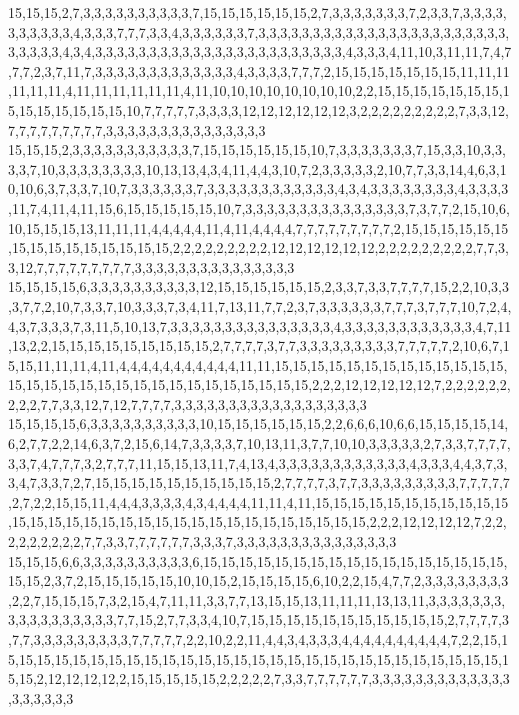 15,15,15,2,7,3,3,3,3,3,3,3,3,3,3,7,15,15,15,15,15,15,2,7,3,3,3,3,3,3,3,7,2,3,3,7,3,3,3,3,3,3,3,3,3,3,4,3,3,3,7,7,7,3,3,4,3,3,3,3,3,3,7,3,3,3,3,3,3,3,3,3,3,3,3,3,3,3,3,3,3,3,3,3,3,3,3,3,3,3,3,4,3,4,3,3,3,3,3,3,3,3,3,3,3,3,3,3,3,3,3,3,3,3,3,3,3,4,3,3,3,4,11,10,3,11,11,7,4,7,7,7,2,3,7,11,7,3,3,3,3,3,3,3,3,3,3,3,3,3,4,3,3,3,3,7,7,7,2,15,15,15,15,15,15,15,11,11,11,11,11,11,4,11,11,11,11,11,11,4,11,10,10,10,10,10,10,10,10,2,2,15,15,15,15,15,15,15,15,15,15,15,15,15,15,10,7,7,7,7,7,3,3,3,3,12,12,12,12,12,12,3,2,2,2,2,2,2,2,2,2,7,3,3,12,7,7,7,7,7,7,7,7,7,3,3,3,3,3,3,3,3,3,3,3,3,3,3,3
15,15,15,2,3,3,3,3,3,3,3,3,3,3,3,7,15,15,15,15,15,15,10,7,3,3,3,3,3,3,3,7,15,3,3,10,3,3,3,3,7,10,3,3,3,3,3,3,3,3,10,13,13,4,3,4,11,4,4,3,10,7,2,3,3,3,3,3,2,10,7,7,3,3,14,4,6,3,10,10,6,3,7,3,3,7,10,7,3,3,3,3,3,3,7,3,3,3,3,3,3,3,3,3,3,3,3,4,3,4,3,3,3,3,3,3,3,3,4,3,3,3,3,11,7,4,11,4,11,15,6,15,15,15,15,15,10,7,3,3,3,3,3,3,3,3,3,3,3,3,3,3,3,7,3,7,7,2,15,10,6,10,15,15,15,13,11,11,11,4,4,4,4,4,11,4,11,4,4,4,4,7,7,7,7,7,7,7,7,7,2,15,15,15,15,15,15,15,15,15,15,15,15,15,15,15,2,2,2,2,2,2,2,2,2,12,12,12,12,12,12,2,2,2,2,2,2,2,2,2,7,7,3,3,12,7,7,7,7,7,7,7,7,7,3,3,3,3,3,3,3,3,3,3,3,3,3,3,3
15,15,15,15,6,3,3,3,3,3,3,3,3,3,3,12,15,15,15,15,15,15,2,3,3,7,3,3,7,7,7,7,15,2,2,10,3,3,3,7,7,2,10,7,3,3,7,10,3,3,3,7,3,4,11,7,13,11,7,7,2,3,7,3,3,3,3,3,3,7,7,7,3,7,7,7,10,7,2,4,4,3,7,3,3,3,7,3,11,5,10,13,7,3,3,3,3,3,3,3,3,3,3,3,3,3,3,3,4,3,3,3,3,3,3,3,3,3,3,3,3,4,7,11,13,2,2,15,15,15,15,15,15,15,15,15,2,7,7,7,7,3,7,7,3,3,3,3,3,3,3,3,3,7,7,7,7,7,2,10,6,7,15,15,11,11,11,4,11,4,4,4,4,4,4,4,4,4,4,4,11,11,15,15,15,15,15,15,15,15,15,15,15,15,15,15,15,15,15,15,15,15,15,15,15,15,15,15,15,15,15,15,2,2,2,12,12,12,12,12,7,2,2,2,2,2,2,2,2,2,7,7,3,3,12,7,12,7,7,7,7,3,3,3,3,3,3,3,3,3,3,3,3,3,3,3,3,3,3
15,15,15,15,6,3,3,3,3,3,3,3,3,3,3,10,15,15,15,15,15,15,2,2,6,6,6,10,6,6,15,15,15,15,14,6,2,7,7,2,2,14,6,3,7,2,15,6,14,7,3,3,3,3,7,10,13,11,3,7,7,10,10,3,3,3,3,3,2,7,3,3,7,7,7,7,3,3,7,4,7,7,7,3,2,7,7,7,11,15,15,13,11,7,4,13,4,3,3,3,3,3,3,3,3,3,3,3,3,4,3,3,3,4,4,3,7,3,3,4,7,3,3,7,2,7,15,15,15,15,15,15,15,15,15,15,2,7,7,7,7,3,7,7,3,3,3,3,3,3,3,3,3,7,7,7,7,7,2,7,2,2,15,15,11,4,4,4,3,3,3,3,4,3,4,4,4,4,11,11,4,11,15,15,15,15,15,15,15,15,15,15,15,15,15,15,15,15,15,15,15,15,15,15,15,15,15,15,15,15,15,15,15,2,2,2,12,12,12,12,7,2,2,2,2,2,2,2,2,2,7,7,3,3,7,7,7,7,7,7,3,3,3,7,3,3,3,3,3,3,3,3,3,3,3,3,3,3,3
15,15,15,6,6,3,3,3,3,3,3,3,3,3,3,6,15,15,15,15,15,15,15,15,15,15,15,15,15,15,15,15,15,15,15,2,3,7,2,15,15,15,15,15,10,10,15,2,15,15,15,15,6,10,2,2,15,4,7,7,2,3,3,3,3,3,3,3,3,2,2,7,15,15,15,7,3,2,15,4,7,11,11,3,3,7,7,13,15,15,13,11,11,11,13,13,11,3,3,3,3,3,3,3,3,3,3,3,3,3,3,3,3,3,7,7,15,2,7,7,3,3,4,10,7,15,15,15,15,15,15,15,15,15,15,15,2,7,7,7,7,3,7,7,3,3,3,3,3,3,3,3,3,7,7,7,7,7,2,2,10,2,2,11,4,4,3,4,3,3,3,4,4,4,4,4,4,4,4,4,4,7,2,2,15,15,15,15,15,15,15,15,15,15,15,15,15,15,15,15,15,15,15,15,15,15,15,15,15,15,15,15,15,15,15,2,12,12,12,12,2,15,15,15,15,15,2,2,2,2,2,7,3,3,7,7,7,7,7,7,3,3,3,3,3,3,3,3,3,3,3,3,3,3,3,3,3,3,3
